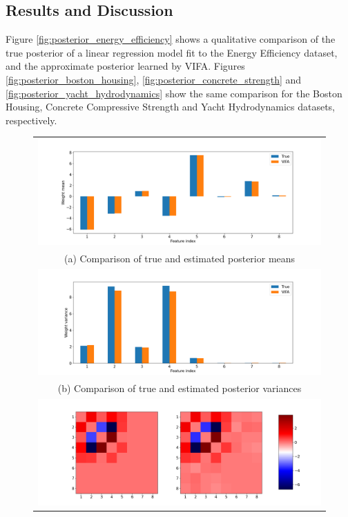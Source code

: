 \documentclass[msc,deptreport.inf]{infthesis} %
\begin{document}
\subsection{Results and Discussion}

Figure \ref{fig:posterior_energy_efficiency} shows a qualitative comparison of the true posterior of a linear regression model fit to the Energy Efficiency dataset, and the approximate posterior learned by VIFA. Figures \ref{fig:posterior_boston_housing}, \ref{fig:posterior_concrete_strength} and \ref{fig:posterior_yacht_hydrodynamics} show the same comparison for the Boston Housing, Concrete Compressive Strength and Yacht Hydrodynamics datasets, respectively. 

\begin{figure}[!htbp] 
	\begin{tabular}{c}
		\includegraphics[width=140mm]{plots/energy_efficiency_posterior_mean.png} \\
		(a) Comparison of true and estimated posterior means \\[6pt] 
		 \includegraphics[width=140mm]{plots/energy_efficiency_posterior_variance.png} \\
		(b) Comparison of true and estimated posterior variances \\[6pt] 
		\includegraphics[width=140mm]{plots/energy_efficiency_posterior_covariance.png} \\

\end{tabular}
\end{figure}
\end{document}
